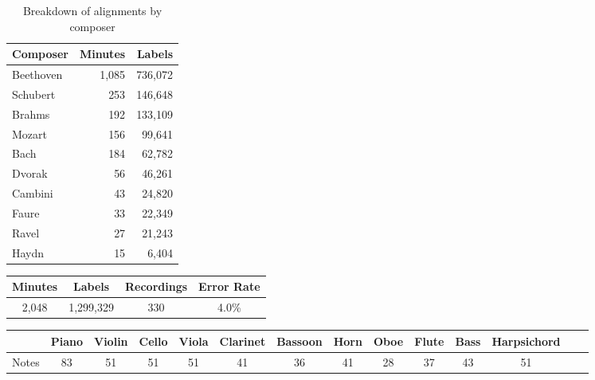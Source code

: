 \documentclass{article} \usepackage{iclr2017_conference,times}
\begin{document}
\iffalse

\begin{table}[h]
  \caption{Breakdown of alignments by composer}
  \label{composer-table}
  \centering
  \begin{tabular}{lrr}
    \toprule
    \cmidrule{1-3}
    Composer     & Minutes & Labels \\
    \midrule
    Beethoven    &    1,085   &  736,072   \\
    Schubert    & 253  & 146,648   \\
    Brahms     &  192  &  133,109 \\
    Mozart    & 156    &   99,641  \\
    Bach & 184  & 62,782  \\
    Dvorak    & 56     &  46,261    \\
    Cambini    &    43   &  24,820 \\
    Faure    & 33    &  22,349 \\
    Ravel    & 27      &   21,243  \\
    Haydn    & 15    & 6,404  \\
    \bottomrule
  \end{tabular}
\end{table}

\begin{table}[h]
  \label{foo-table}
  \centering
  \begin{tabular}{cccc}
    \toprule
    \cmidrule{1-4}
    Minutes    &  Labels & Recordings & Error Rate \\
    \midrule
    2,048 & 1,299,329  & 330 & 4.0\% \\
    \bottomrule
  \end{tabular}
\end{table}

\begin{table}[h]
  \label{notes-table}
  \centering
  \tabcolsep=0.09cm
  \begin{tabular}{c|ccccccccccccr}
    \toprule
    \cmidrule{1-13}
        &  Piano & Violin & Cello & Viola & Clarinet & Bassoon & Horn & Oboe & Flute & Bass & Harpsichord &\\
    \midrule
     Notes & 83  & 51 & 51 & 51 & 41 & 36 & 41 & 28 & 37 & 43 & 51 &\\
    \bottomrule
  \end{tabular}
\end{table}
\end{document}
